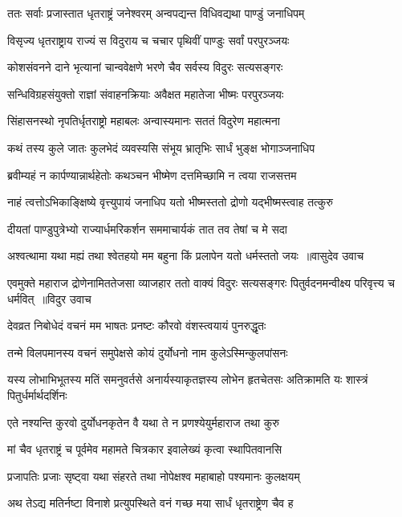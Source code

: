 \twolineshloka
{ततः सर्वाः प्रजास्तात धृतराष्ट्रं जनेश्वरम्}
{अन्वपद्यन्त विधिवद्यथा पाण्डुं जनाधिपम्}


\twolineshloka
{विसृज्य धृतराष्ट्राय राज्यं स विदुराय च}
{चचार पृथिवीं पाण्डुः सर्वां परपुरञ्जयः}


\twolineshloka
{कोशसंवनने दाने भृत्यानां चान्ववेक्षणे}
{भरणे चैव सर्वस्य विदुरः सत्यसङ्गरः}


\twolineshloka
{सन्धिविग्रहसंयुक्तो राज्ञां संवाहनक्रियाः}
{अवैक्षत महातेजा भीष्मः परपुरञ्जयः}


\twolineshloka
{सिंहासनस्थो नृपतिर्धृतराष्ट्रो महाबलः}
{अन्वास्यमानः सततं विदुरेण महात्मना}


\twolineshloka
{कथं तस्य कुले जातः कुलभेदं व्यवस्यसि}
{संभूय भ्रातृभिः सार्धं भुङ्क्ष भोगाञ्जनाधिप}


\twolineshloka
{ब्रवीम्यहं न कार्पण्यान्नार्थहेतोः कथञ्चन}
{भीष्मेण दत्तमिच्छामि न त्वया राजसत्तम}


\twolineshloka
{नाहं त्वत्तोऽभिकाङ्क्षिष्ये वृत्त्युपायं जनाधिप}
{यतो भीष्मस्ततो द्रोणो यद्भीष्मस्त्वाह तत्कुरु}


\twolineshloka
{दीयतां पाण्डुपुत्रेभ्यो राज्यार्धमरिकर्शन}
{सममाचार्यकं तात तव तेषां च मे सदा}


\threelineshloka
{अश्वत्थामा यथा मह्यं तथा श्वेतहयो मम}
{बहुना किं प्रलापेन यतो धर्मस्ततो जयः ॥वासुदेव उवाच}
{}


\fourlineindentedshloka
{एवमुक्ते महाराज द्रोणेनामिततेजसा}
{व्याजहार ततो वाक्यं विदुरः सत्यसङ्गरः}
{पितुर्वदनमन्वीक्ष्य परिवृत्त्य च धर्मवित् ॥विदुर उवाच}
{}


\twolineshloka
{देवव्रत निबोधेदं वचनं मम भाषतः}
{प्रनष्टः कौरवो वंशस्त्वयायं पुनरुद्धृतः}


\twolineshloka
{तन्मे विलपमानस्य वचनं समुपेक्षसे}
{कोयं दुर्योधनो नाम कुलेऽस्मिन्कुलपांसनः}


\threelineshloka
{यस्य लोभाभिभूतस्य मतिं समनुवर्तसे}
{अनार्यस्याकृतज्ञस्य लोभेन हृतचेतसः}
{अतिक्रामति यः शास्त्रं पितुर्धर्मार्थदर्शिनः}


\twolineshloka
{एते नश्यन्ति कुरवो दुर्योधनकृतेन वै}
{यथा ते न प्रणश्येयुर्महाराज तथा कुरु}


\twolineshloka
{मां चैव धृतराष्ट्रं च पूर्वमेव महामते}
{चित्रकार इवालेख्यं कृत्वा स्थापितवानसि}


\twolineshloka
{प्रजापतिः प्रजाः सृष्ट्वा यथा संहरते तथा}
{नोपेक्षश्व महाबाहो पश्यमानः कुलक्षयम्}


\twolineshloka
{अथ तेऽद्य मतिर्नष्टा विनाशे प्रत्युपस्थिते}
{वनं गच्छ मया सार्धं धृतराष्ट्रेण चैव ह}


